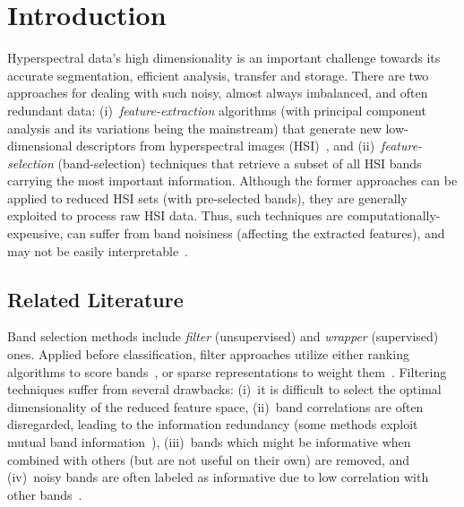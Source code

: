 \documentclass[journal]{IEEEtran}
\begin{document}
%
\IEEEpeerreviewmaketitle



\section{Introduction}

Hyperspectral data's high dimensionality is an important challenge towards its accurate segmentation, efficient analysis, transfer and storage. There are two approaches for dealing with such noisy, almost always imbalanced, and often redundant data: (i)~\emph{feature-extraction} algorithms (with principal component analysis and its variations being the mainstream) that generate new low-dimensional descriptors from hyperspectral images (HSI)~\cite{7450160}, and (ii)~\emph{feature-selection} (band-selection) techniques that retrieve a subset of all HSI bands carrying the most important information. Although the former approaches can be applied to reduced HSI sets (with pre-selected bands), they are generally exploited to process raw HSI data. Thus, such techniques are computationally-expensive, can suffer from band noisiness (affecting the extracted features), and may not be easily interpretable~\cite{YANG2017396}.

\subsection{Related Literature}

Band selection methods include \emph{filter} (unsupervised) and \emph{wrapper} (supervised) ones. Applied before classification, filter approaches utilize either ranking algorithms to score bands~\cite{5744136,LI2014241}, or sparse representations to weight them~\cite{DBLP:journals/corr/abs-1802-06983}. Filtering techniques suffer from several drawbacks: (i)~it is difficult to select the optimal dimensionality of the reduced feature space, (ii)~band correlations are often disregarded, leading to the information redundancy (some methods exploit mutual band information~\cite{2040-8986-13-1-015401,1715309,YANG2017396}), (iii)~bands which might be informative when combined with others (but are not useful on their own) are removed, and (iv)~noisy bands are often labeled as informative due to low correlation with other bands~\cite{doi:10.1080/01431161.2017.1302110}.
\end{document}
